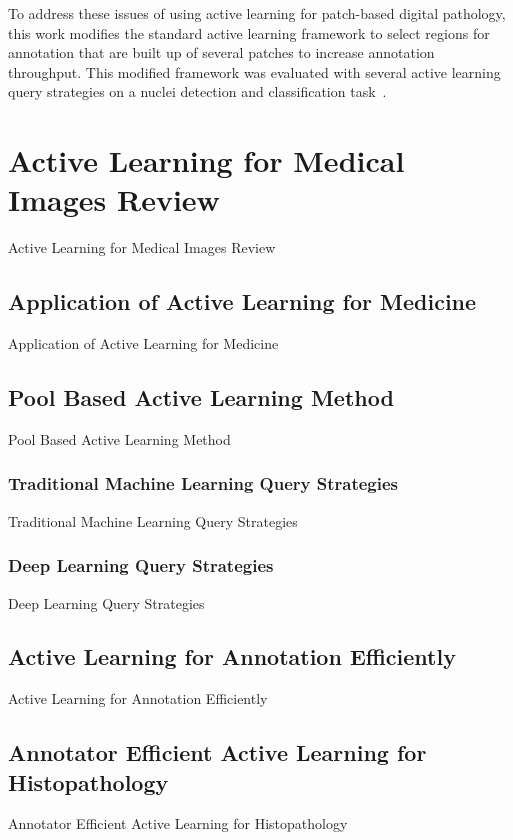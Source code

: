 To address these issues of using active learning for patch-based digital pathology, this work modifies the standard active learning framework to select regions for annotation that are built up of several patches to increase annotation throughput. This modified framework was evaluated with several active learning query strategies on a nuclei detection and classification task~\citep{sirinukunwattana2016locality}.



\section{Active Learning for Medical Images Review}
Active Learning for Medical Images Review

\subsection{Application of Active Learning for Medicine}
Application of Active Learning for Medicine

\subsection{Pool Based Active Learning Method}
Pool Based Active Learning Method 

\subsubsection{Traditional Machine Learning Query Strategies}
Traditional Machine Learning Query Strategies

\subsubsection{Deep Learning Query Strategies}
Deep Learning Query Strategies

\subsection{Active Learning for Annotation Efficiently}
Active Learning for Annotation Efficiently

\subsection{Annotator Efficient Active Learning for Histopathology}
Annotator Efficient Active Learning for Histopathology



